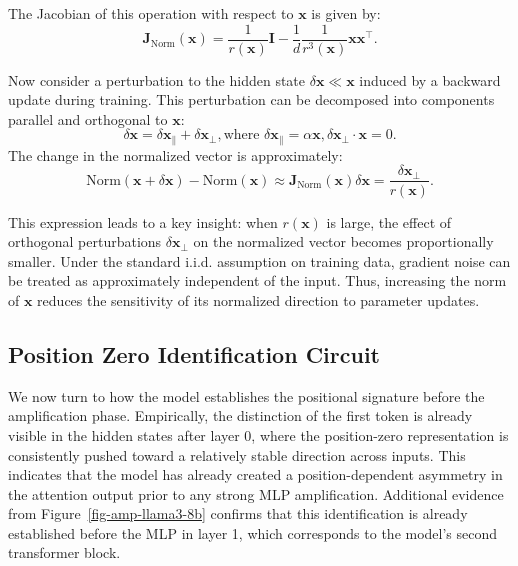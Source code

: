\documentclass[]{template}
\theoremstyle{plain}
\theoremstyle{definition}
\theoremstyle{remark}
\begin{document}
The Jacobian of this operation with respect to $\mathbf{x}$ is given by:
\begin{equation}
    \mathbf{J}_{\text{Norm}}(\mathbf{x}) = \frac{1}{r(\mathbf{x})} \mathbf{I} - \frac{1}{d} \frac{1}{r^3(\mathbf{x})} \mathbf{x} \mathbf{x}^\top.
\end{equation}

Now consider a perturbation to the hidden state $\delta \mathbf{x} \ll \mathbf{x}$ induced by a backward update during training. This perturbation can be decomposed into components parallel and orthogonal to $\mathbf{x}$:
\begin{equation}
    \delta \mathbf{x} = \delta \mathbf{x}_\parallel + \delta \mathbf{x}_\perp, \text{where } \delta \mathbf{x}_\parallel = \alpha \mathbf{x}, \delta \mathbf{x}_\perp \cdot \mathbf{x} = 0.
\end{equation}
The change in the normalized vector is approximately:
\begin{equation}
    \text{Norm}(\mathbf{x} + \delta \mathbf{x}) - \text{Norm}(\mathbf{x}) \approx \mathbf{J}_{\text{Norm}}(\mathbf{x})\delta\mathbf{x}  =  \frac{\delta \mathbf{x}_\perp}{r(\mathbf{x})} .
    \label{eq:norm}
\end{equation}

This expression leads to a key insight: when $r(\mathbf{x})$ is large, the effect of orthogonal perturbations $\delta \mathbf{x}_\perp$ on the normalized vector becomes proportionally smaller. Under the standard i.i.d. assumption on training data, gradient noise can be treated as approximately independent of the input. Thus, increasing the norm of $\mathbf{x}$ reduces the sensitivity of its normalized direction to parameter updates.


\subsection{Position Zero Identification Circuit}

We now turn to how the model establishes the positional signature before the amplification phase. Empirically, the distinction of the first token is already visible in the hidden states after layer 0, where the position-zero representation is consistently pushed toward a relatively stable direction across inputs. This indicates that the model has already created a position-dependent asymmetry in the attention output prior to any strong MLP amplification. Additional evidence from Figure~\ref{fig-amp-llama3-8b} confirms that this identification is already established before the MLP in layer 1, which corresponds to the model’s second transformer block.
\end{document}
